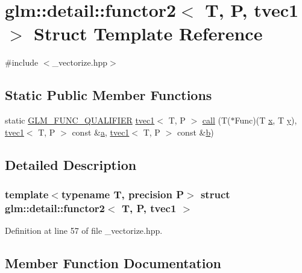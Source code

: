 \hypertarget{structglm_1_1detail_1_1functor2_3_01_t_00_01_p_00_01tvec1_01_4}{}\section{glm\+::detail\+::functor2$<$ T, P, tvec1 $>$ Struct Template Reference}
\label{structglm_1_1detail_1_1functor2_3_01_t_00_01_p_00_01tvec1_01_4}


{\ttfamily \#include $<$\+\_\+vectorize.\+hpp$>$}

\subsection*{Static Public Member Functions}
\begin{DoxyCompactItemize}
\item 
static \mbox{\hyperlink{setup_8hpp_a33fdea6f91c5f834105f7415e2a64407}{G\+L\+M\+\_\+\+F\+U\+N\+C\+\_\+\+Q\+U\+A\+L\+I\+F\+I\+ER}} \mbox{\hyperlink{structglm_1_1tvec1}{tvec1}}$<$ T, P $>$ \mbox{\hyperlink{structglm_1_1detail_1_1functor2_3_01_t_00_01_p_00_01tvec1_01_4_a7f805874487ee439ec9f5ca600f1813d}{call}} (T($\ast$Func)(T \mbox{\hyperlink{glad_8h_a92d0386e5c19fb81ea88c9f99644ab1d}{x}}, T \mbox{\hyperlink{glad_8h_a66ddd433d2cacfe27f5906b7e86faeed}{y}}), \mbox{\hyperlink{structglm_1_1tvec1}{tvec1}}$<$ T, P $>$ const \&\mbox{\hyperlink{glad_8h_ac8729153468b5dcf13f971b21d84d4e5}{a}}, \mbox{\hyperlink{structglm_1_1tvec1}{tvec1}}$<$ T, P $>$ const \&\mbox{\hyperlink{glad_8h_a6eba317e3cf44d6d26c04a5a8f197dcb}{b}})
\end{DoxyCompactItemize}


\subsection{Detailed Description}
\subsubsection*{template$<$typename T, precision P$>$\newline
struct glm\+::detail\+::functor2$<$ T, P, tvec1 $>$}



Definition at line 57 of file \+\_\+vectorize.\+hpp.



\subsection{Member Function Documentation}
\mbox{\label{structglm_1_1detail_1_1functor2_3_01_t_00_01_p_00_01tvec1_01_4_a7f805874487ee439ec9f5ca600f1813d}} 
